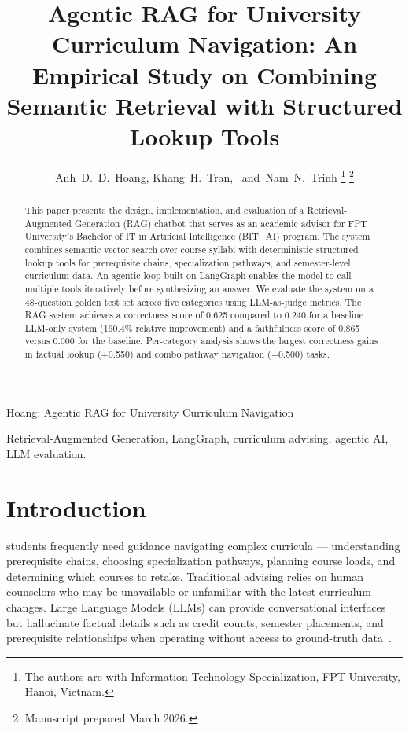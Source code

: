 \documentclass[lettersize,journal]{IEEEtran}
\begin{document}
\title{Agentic RAG for University Curriculum Navigation: An Empirical Study on Combining Semantic Retrieval with Structured Lookup Tools}

\author{Anh~D.~D.~Hoang, Khang~H.~Tran, ~and~Nam~N.~Trinh
\thanks{The authors are with Information Technology Specialization, FPT University, Hanoi, Vietnam.}
\thanks{Manuscript prepared March 2026.}}

%
{Hoang: Agentic RAG for University Curriculum Navigation}

\maketitle

\begin{abstract}
This paper presents the design, implementation, and evaluation of a Retrieval-Augmented Generation (RAG) chatbot that serves as an academic advisor for FPT University's Bachelor of IT in Artificial Intelligence (BIT\_AI) program. The system combines semantic vector search over course syllabi with deterministic structured lookup tools for prerequisite chains, specialization pathways, and semester-level curriculum data. An agentic loop built on LangGraph enables the model to call multiple tools iteratively before synthesizing an answer. We evaluate the system on a 48-question golden test set across five categories using LLM-as-judge metrics. The RAG system achieves a correctness score of 0.625 compared to 0.240 for a baseline LLM-only system (160.4\% relative improvement) and a faithfulness score of 0.865 versus 0.000 for the baseline. Per-category analysis shows the largest correctness gains in factual lookup (+0.550) and combo pathway navigation (+0.500) tasks.
\end{abstract}

\begin{IEEEkeywords}
Retrieval-Augmented Generation, LangGraph, curriculum advising, agentic AI, LLM evaluation.
\end{IEEEkeywords}

\section{Introduction}
 students frequently need guidance navigating complex curricula --- understanding prerequisite chains, choosing specialization pathways, planning course loads, and determining which courses to retake. Traditional advising relies on human counselors who may be unavailable or unfamiliar with the latest curriculum changes. Large Language Models (LLMs) can provide conversational interfaces but hallucinate factual details such as credit counts, semester placements, and prerequisite relationships when operating without access to ground-truth data~\cite{ref_rag_survey}.
\end{document}

